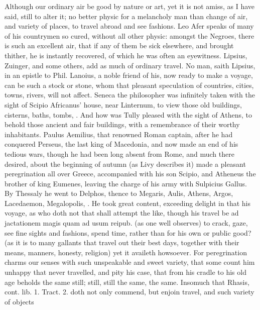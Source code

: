 {Although our ordinary air be good by nature or art, yet it is not
amiss, as I have said, still to alter it; no better physic for a
melancholy man than change of air, and variety of places, to travel
abroad and see fashions. Leo Afer speaks of many of his
countrymen so cured, without all other physic: amongst the Negroes,
there is such an excellent air, that if any of them be sick elsewhere,
and brought thither, he is instantly recovered, of which he was often
an eyewitness. Lipsius, Zuinger, and some others, add as much of
ordinary travel. No man, saith Lipsius, in an epistle to Phil. Lanoius,
a noble friend of his, now ready to make a voyage, can be such a
stock or stone, whom that pleasant speculation of countries, cities,
towns, rivers, will not affect.  Seneca the philosopher was
infinitely taken with the sight of Scipio Africanus' house, near
Linternum, to view those old buildings, cisterns, baths, tombs, \etc{}. And
how was Tully pleased with the sight of Athens, to behold those
ancient and fair buildings, with a remembrance of their worthy
inhabitants. Paulus Aemilius, that renowned Roman captain, after he had
conquered Perseus, the last king of Macedonia, and now made an end of
his tedious wars, though he had been long absent from Rome, and much
there desired, about the beginning of autumn (as Livy describes
it) made a pleasant peregrination all over Greece, accompanied with his
son Scipio, and Atheneus the brother of king Eumenes, leaving the
charge of his army with Sulpicius Gallus. By Thessaly he went to
Delphos, thence to Megaris, Aulis, Athens, Argos, Lacedaemon,
Megalopolis, \etc{}. He took great content, exceeding delight in that his
voyage, as who doth not that shall attempt the like, though his travel
be ad jactationem magis quam ad usum reipub. (as one well
observes) to crack, gaze, see fine sights and fashions, spend time,
rather than for his own or public good? (as it is to many gallants that
travel out their best days, together with their means, manners,
honesty, religion) yet it availeth howsoever. For peregrination charms
our senses with such unspeakable and sweet variety, that some
count him unhappy that never travelled, and pity his case, that from
his cradle to his old age beholds the same still; still, still the
same, the same. Insomuch that Rhasis, cont. lib. 1. Tract. 2.
doth not only commend, but enjoin travel, and such variety of objects
}
